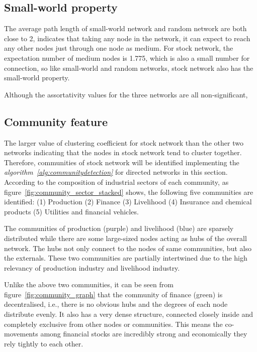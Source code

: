 \subsection{Small-world property}
The average path length of small-world network and random network are both close to 2, indicates that taking any node in the network, it can expect to reach any other nodes just through one node as medium. For stock network, the expectation number of medium nodes is 1.775, which is also a small number for connection, so like small-world and random networks, stock network also has the small-world property.


Although the assortativity values for the three networks are all non-significant, 

\subsection{Community feature}
The larger value of clustering coefficient for stock network than the other two networks indicating that the nodes in stock network tend to cluster together. Therefore, communities of stock network will be identified implementing the \textit{algorithm~\ref{alg:communitydetection}} for directed networks in this section. According to the composition of industrial sectors of each community, as figure~\ref{fig:community_sector_stacked} shows, the following five communities are identified: (1) Production (2) Finance (3) Livelihood (4) Insurance and chemical products (5) Utilities and financial vehicles.

The communities of production (purple) and livelihood (blue) are sparsely distributed while there are some large-sized nodes acting as hubs of the overall network. The hubs not only connect to the nodes of same communities, but also the externals. These two communities are partially intertwined due to the high relevancy of production industry and livelihood industry. 

Unlike the above two communities, it can be seen from figure~\ref{fig:community_graph} that the community of finance (green) is decentralised, i.e., there is no obvious hubs and the degrees of each node distribute evenly. It also has a very dense structure, connected closely inside and completely exclusive from other nodes or communities. This means the co-movements among financial stocks are incredibly strong and economically they rely tightly to each other.

